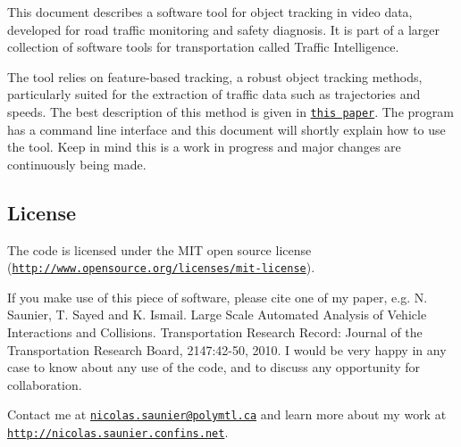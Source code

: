 This document describes a software tool for object tracking in video data, developed for road traffic monitoring and safety diagnosis. It is part of a larger collection of software tools for transportation called Traffic Intelligence.

The tool relies on feature-\/based tracking, a robust object tracking methods, particularly suited for the extraction of traffic data such as trajectories and speeds. The best description of this method is given in \href{http://nicolas.saunier.confins.net/data/saunier06crv.html}{\tt this paper}. The program has a command line interface and this document will shortly explain how to use the tool. Keep in mind this is a work in progress and major changes are continuously being made.\hypertarget{feature_based_tracking_License}{}\subsection{License}\label{feature_based_tracking_License}
The code is licensed under the M\-I\-T open source license (\href{http://www.opensource.org/licenses/mit-license}{\tt http\-://www.\-opensource.\-org/licenses/mit-\/license}).

If you make use of this piece of software, please cite one of my paper, e.\-g. N. Saunier, T. Sayed and K. Ismail. Large Scale Automated Analysis of Vehicle Interactions and Collisions. Transportation Research Record\-: Journal of the Transportation Research Board, 2147\-:42-\/50, 2010. I would be very happy in any case to know about any use of the code, and to discuss any opportunity for collaboration.

Contact me at \href{mailto:nicolas.saunier@polymtl.ca}{\tt nicolas.\-saunier@polymtl.\-ca} and learn more about my work at \href{http://nicolas.saunier.confins.net}{\tt http\-://nicolas.\-saunier.\-confins.\-net}. 